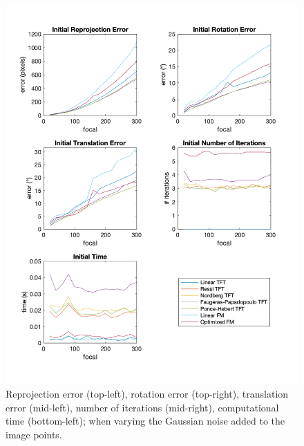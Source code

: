 \begin{figure}[p]
	\centering
	\includegraphics[width=1\textwidth]{Experiments/Synthetic/focal/INITfocalPlots.png}
	\caption{Reprojection error (top-left), rotation error (top-right), translation error (mid-left), number of iterations (mid-right), computational time (bottom-left); when varying the Gaussian noise added to the image points.}
\end{figure}

